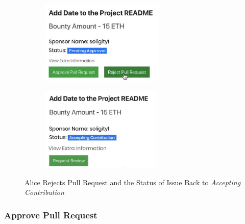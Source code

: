 \documentclass[12pt]{article}
\renewcommand{\_}{\kern-1.5pt\textunderscore\kern-1.5pt}
\begin{document}
\begin{figure}[H]
	\centering
	\begin{subfigure}[b]{.45\textwidth}
		\centering
		\includegraphics[height=4cm]{graphs/38. alice_reject_pull_request}
	\end{subfigure}
	\begin{subfigure}[b]{.45\textwidth}
		\centering
		\includegraphics[height=4cm]{graphs/39. issue_info_updated}
	\end{subfigure}
	\caption{Alice Rejects Pull Request and the Status of Issue Back to \textit{Accepting Contribution}}
\end{figure}


\subsubsection{Approve Pull Request}
\end{document}
